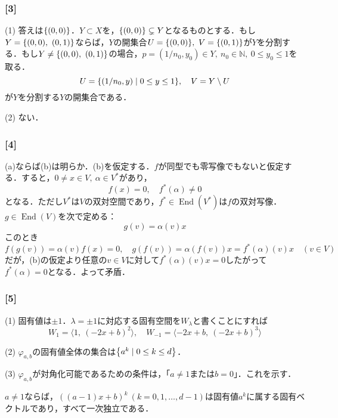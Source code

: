 \documentclass[a4j]{ltjsarticle}
\newcommand{\Nset}{\mathbb{N}}
\newcommand{\1}{\mathbbm{1}}
\numberwithin{equation}{section}
\theoremstyle{definition}
\begin{document}
\subsubsection*{[3]}
(1) 答えは$\qty{(0,0)}$．$Y\subset X$を，$\qty{(0,0)}\subsetneq Y$となるものとする．もし$Y=\qty{(0,0),\ (0,1)}$ならば，$Y$の開集合$U=\qty{(0,0)},\ V=\qty{(0,1)}$が$Y$を分割する．もし$Y\neq \qty{(0,0),\ (0,1)}$の場合，$p=(1/n_0,y_0)\in Y,\ n_0\in\Nset,\ 0\leq y_0\leq 1$を取る．
\begin{equation}
    U=\qty{(1/n_0,y)\mid 0\leq y\leq 1},\quad V=Y\setminus U 
\end{equation}
が$Y$を分割する$Y$の開集合である．

(2) ない．

\subsubsection*{[4]}
(a)ならば(b)は明らか．(b)を仮定する．$f$が同型でも零写像でもないと仮定する．すると，$0\neq x\in V,\ \alpha\in V^\ast$があり，
\begin{equation}
    f(x)=0,\quad f^\ast(\alpha)\neq0 
\end{equation}
となる．ただし$V^\ast$は$V$の双対空間であり，$f^\ast\in \mathop{\mathrm{End}}(V^\ast)$は$f$の双対写像．$g\in \mathop{\mathrm{End}}(V)$を次で定める：
\begin{equation}
    g(v)=\alpha(v)x
\end{equation}
このとき
\begin{equation}
    f(g(v))=\alpha(v)f(x)=0,\quad g(f(v))=\alpha(f(v))x=f^\ast(\alpha)(v)x\quad (v\in V)
\end{equation}
だが，(b)の仮定より任意の$v\in V$に対して$f^\ast(\alpha)(v)x=0$したがって$f^\ast(\alpha)=0$となる．よって矛盾．
\subsubsection*{[5]}
(1) 固有値は$\pm 1$．$\lambda=\pm1$に対応する固有空間を$W_{\lambda}$と書くことにすれば
\begin{equation}
    W_{1}=\langle1,\ (-2x+b)^2\rangle ,\quad W_{-1}=\langle-2x+b,\ (-2x+b)^3\rangle
\end{equation}

(2) $\varphi_{a,b}$の固有値全体の集合は$\qty{a^k\mid 0\leq k\leq d}$．

(3) $\varphi_{a,b}$が対角化可能であるための条件は，「$a\neq 1$または$b=0$」．これを示す．

$a\neq 1$ならば，$((a-1)x+b)^k\ (k=0,1,\ldots,d-1)$は固有値$a^k$に属する固有ベクトルであり，すべて一次独立である．
\end{document}

